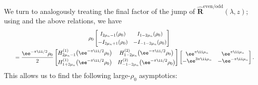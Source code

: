 We turn to analogously treating the final factor of the jump of $\hat{\mathbf{R}}^{\mathrm{even/odd}}(\lambda,z)$; using \cite[equation~(10.27.7)]{DLMF} and the above relations, we have
\begin{gather*}
{\rho_0} \begin{bmatrix}I_{2\mu_n - 1}(\rho_0) & I_{1- 2\mu_n}(\rho_0)\vspace{1mm}\\
 -I_{2\mu_n +1}(\rho_0) & -I_{-1-2\mu_n}(\rho_0)\end{bmatrix} \\
 \qquad= \dfrac{\ee^{-\pi \ii/2}\rho_0}{2} \begin{bmatrix} H^{(1)}_{2\mu_n-1}\big(\ee^{-\pi \ii/2} \rho_0\big) & H^{(2)}_{1-2\mu_n}\big(\ee^{-\pi \ii/2} \rho_0\big)\vspace{1mm}\\ H^{(1)}_{1+2\mu_n}\big(\ee^{-\pi \ii/2} \rho_0\big) & H^{(2)}_{-1-2\mu_n}\big(\ee^{-\pi \ii/2} \rho_0\big)\end{bmatrix} \begin{bmatrix} \ee^{\pi \ii \mu_n}& \ee^{\pi \ii \mu_n}\\ - \ee^{3\pi \ii \mu_n} & - \ee^{-\pi \ii \mu_n} \end{bmatrix}.
\end{gather*}
This allows us to find the following large-$\rho_0$ asymptotics:
